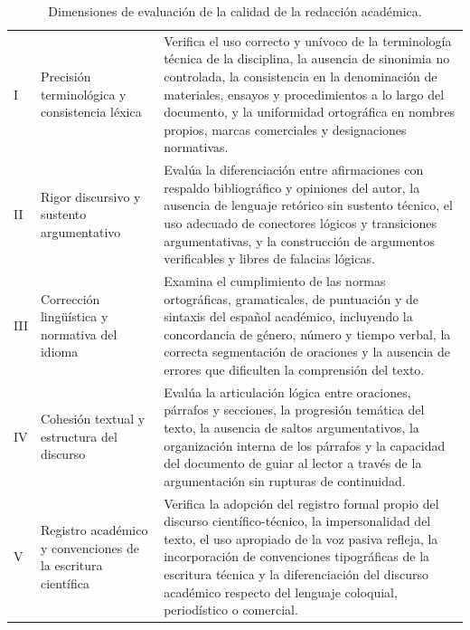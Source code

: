 \vspace{-10pt}
\begin{table}[htbp]
\centering
\scriptsize
\caption{Dimensiones de evaluación de la calidad de la redacción académica.}
\label{tab:dim-redaccion-academica}
\begin{tabularx}{\textwidth}{|C{0.8cm}|L{3cm}|X|}
\hline
{}
 &  &  \\ \hline
I & Precisión terminológica y consistencia léxica & Verifica el uso correcto y unívoco de la terminología técnica de la disciplina, la ausencia de sinonimia no controlada, la consistencia en la denominación de materiales, ensayos y procedimientos a lo largo del documento, y la uniformidad ortográfica en nombres propios, marcas comerciales y designaciones normativas. \\ \hline
{}
II & Rigor discursivo y sustento argumentativo & Evalúa la diferenciación entre afirmaciones con respaldo bibliográfico y opiniones del autor, la ausencia de lenguaje retórico sin sustento técnico, el uso adecuado de conectores lógicos y transiciones argumentativas, y la construcción de argumentos verificables y libres de falacias lógicas. \\ \hline
III & Corrección lingüística y normativa del idioma & Examina el cumplimiento de las normas ortográficas, gramaticales, de puntuación y de sintaxis del español académico, incluyendo la concordancia de género, número y tiempo verbal, la correcta segmentación de oraciones y la ausencia de errores que dificulten la comprensión del texto. \\ \hline
{}
IV & Cohesión textual y estructura del discurso & Evalúa la articulación lógica entre oraciones, párrafos y secciones, la progresión temática del texto, la ausencia de saltos argumentativos, la organización interna de los párrafos y la capacidad del documento de guiar al lector a través de la argumentación sin rupturas de continuidad. \\ \hline
V & Registro académico y convenciones de la escritura científica & Verifica la adopción del registro formal propio del discurso científico-técnico, la impersonalidad del texto, el uso apropiado de la voz pasiva refleja, la incorporación de convenciones tipográficas de la escritura técnica y la diferenciación del discurso académico respecto del lenguaje coloquial, periodístico o comercial. \\ \hline
\end{tabularx}
\end{table}

